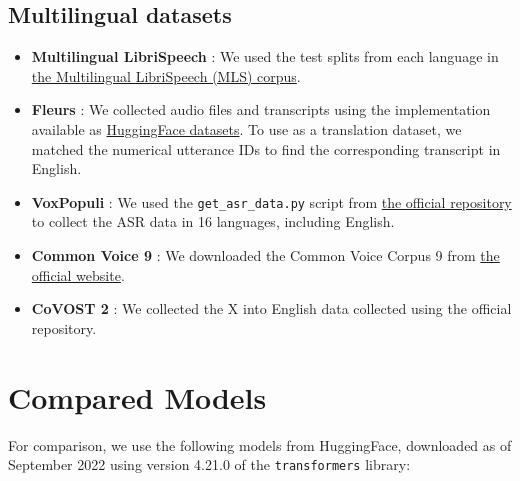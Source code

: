 \documentclass[nohyperref]{article}
\theoremstyle{plain}
\theoremstyle{definition}
\theoremstyle{remark}
\begin{document}
\subsection{Multilingual datasets}

\begin{itemize}
    \item \textbf{Multilingual LibriSpeech} \cite{pratap2020mls}: We used the test splits from each language in \href{https://www.openslr.org/94/}{the Multilingual LibriSpeech (MLS) corpus}.
    \item \textbf{Fleurs} \cite{conneau2022fleurs}: We collected audio files and transcripts using the implementation available as \href{https://huggingface.co/datasets/google/fleurs/blob/main/fleurs.py}{HuggingFace datasets}. To use as a translation dataset, we matched the numerical utterance IDs to find the corresponding transcript in English.
    \item \textbf{VoxPopuli} \cite{wang2021voxpopuli}: We used the \texttt{get\_asr\_data.py} script from \href{https://github.com/facebookresearch/voxpopuli}{the official repository} to collect the ASR data in 16 languages, including English.
    \item \textbf{Common Voice 9} \cite{ardila2019common}: We downloaded the Common Voice Corpus 9 from \href{https://commonvoice.mozilla.org/en/datasets}{the official website}.
    \item \textbf{CoVOST 2} \cite{wang2020covost}: We collected the X into English data collected using the official repository.
\end{itemize}

\section{Compared Models}\label{sec:baseline-models}

For comparison, we use the following models from HuggingFace, downloaded as of September 2022 using version 4.21.0 of the \texttt{transformers} library:
\end{document}
